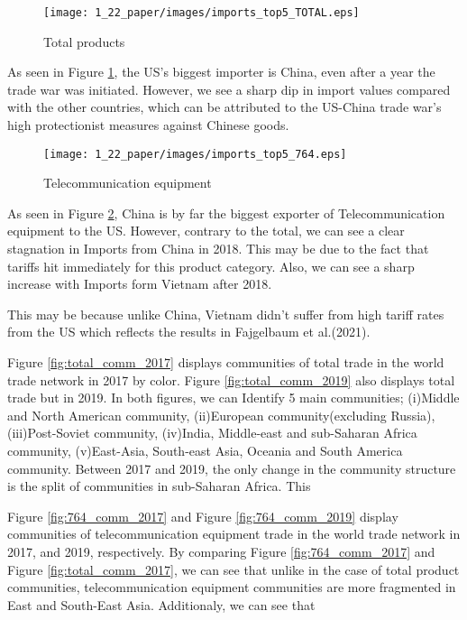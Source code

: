 \documentclass[a4paper, 12pt]{article}
\begin{document}
\begin{figure}[H]
    \centering
    \texttt{[image: 1\_22\_paper/images/imports\_top5\_TOTAL.eps]}
    \caption{Total products}
    \label{fig:total_top5}
\end{figure}
As seen in Figure \ref{fig:total_top5}, the US's biggest importer is China, even after a year the trade war was initiated.
However, we see a sharp dip in import values compared with the other countries, which can be attributed to the US-China trade war's high protectionist measures against Chinese goods.
\begin{figure}[H]
    \centering
    \texttt{[image: 1\_22\_paper/images/imports\_top5\_764.eps]}
    \caption{Telecommunication equipment}
    \label{fig:764_top5}
\end{figure}
As seen in Figure \ref{fig:764_top5}, China is by far the biggest exporter of Telecommunication equipment to the US.
However, contrary to the total, we can see a clear stagnation in Imports from China in 2018.
This may be due to the fact that tariffs hit immediately for this product category.
Also, we can see a sharp increase with Imports form Vietnam after 2018.\par
This may be because unlike China, Vietnam didn't suffer from high tariff rates from the US which reflects the results in Fajgelbaum et al.(2021)\cite{fajgelbaum2021}.\par
Figure \ref{fig:total_comm_2017} displays communities of total trade in the world trade network in 2017 by color.
Figure \ref{fig:total_comm_2019} also displays total trade but in 2019. 
In both figures, we can Identify 5 main communities; 
(i)Middle and North American community, (ii)European community(excluding Russia), (iii)Post-Soviet community, (iv)India, Middle-east and sub-Saharan Africa community, (v)East-Asia, South-east Asia, Oceania and South America community.
Between 2017 and 2019, the only change in the community structure is the split of communities in sub-Saharan Africa.
This 


Figure \ref{fig:764_comm_2017} and Figure \ref{fig:764_comm_2019} display communities of telecommunication equipment trade in the world trade network in 2017, and 2019, respectively.
By comparing Figure \ref{fig:764_comm_2017} and Figure \ref{fig:total_comm_2017}, we can see that unlike in the case of total product communities, telecommunication equipment communities are more fragmented in East and South-East Asia.
Additionaly, we can see that 
\end{document}

